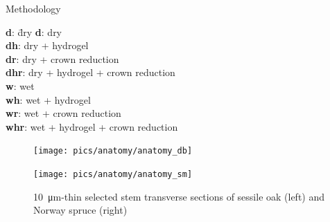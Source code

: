 \documentclass[final]{beamer}
\newlength{\colwidth}
\begin{document}
\begin{frame}[t]
\begin{columns}[t]
\begin{column}{\colwidth}
\begin{block}{Methodology}
\begin{minipage}[t]{0.45\textwidth}
\begin{tabbing}
    \textbf{d}: \quad\= dry \kill
    \textbf{d}: \> dry \\
    \textbf{dh}: \> dry + hydrogel \\
    \textbf{dr}: \> dry + crown reduction \\
    \textbf{dhr}: \> dry + hydrogel + crown reduction \\
    \textbf{w}: \> wet \\
    \textbf{wh}: \> wet + hydrogel \\
    \textbf{wr}: \> wet + crown reduction \\
    \textbf{whr}: \> wet + hydrogel + crown reduction
\end{tabbing}
\end{minipage}\hfill


\begin{figure}
    \begin{minipage}{0.5\textwidth}
        \centering \texttt{[image: pics/anatomy/anatomy\_db]}
        \caption*{Sessile oak, \SI{50}{\centi\meter} from apex. Scale bar: \SI{1000}{\micro\meter} (50x)}
        \label{fig:anatomy_db}
    \end{minipage}\hfill
    \begin{minipage}{0.5\textwidth}
        \centering \texttt{[image: pics/anatomy/anatomy\_sm]}
        \caption*{Norway spruce, \SI{25}{\centi\meter} from apex. Scale bar: \SI{500}{\micro\meter} (200x)}
        \label{fig:anatomy_sm}
    \end{minipage}\hfill
    \caption{\SI{10}{\micro\meter}-thin selected stem transverse sections of sessile oak (left) and Norway spruce (right)}
    \label{fig:anatomy}
\end{figure}
\end{block}


\end{column}
\end{columns}
\end{frame}
\end{document}

